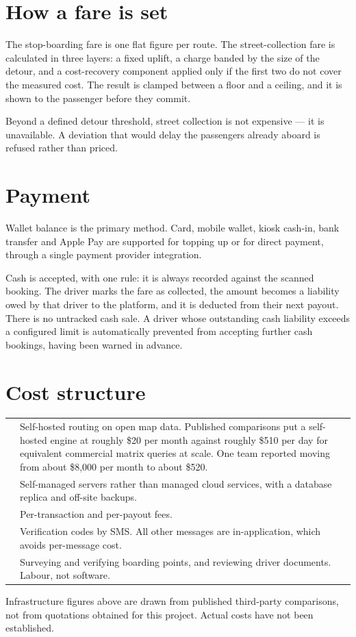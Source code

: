 \section{How a fare is set}

The stop-boarding fare is one flat figure per route. The street-collection fare is calculated in
three layers: a fixed uplift, a charge banded by the size of the detour, and a cost-recovery
component applied only if the first two do not cover the measured cost. The result is clamped
between a floor and a ceiling, and it is shown to the passenger before they commit.

Beyond a defined detour threshold, street collection is not expensive --- it is unavailable. A
deviation that would delay the passengers already aboard is refused rather than priced.

\section{Payment}

Wallet balance is the primary method. Card, mobile wallet, kiosk cash-in, bank transfer and Apple
Pay are supported for topping up or for direct payment, through a single payment provider
integration.

Cash is accepted, with one rule: it is always recorded against the scanned booking. The driver marks
the fare as collected, the amount becomes a liability owed by that driver to the platform, and it is
deducted from their next payout. There is no untracked cash sale. A driver whose outstanding cash
liability exceeds a configured limit is automatically prevented from accepting further cash
bookings, having been warned in advance.

\section{Cost structure}

\begin{center}
\begin{tabularx}{\textwidth}{@{}L{40mm}Y@{}}
\toprule
{} & Self-hosted routing on open map data. Published comparisons put a self-hosted engine at roughly \$20 per month against roughly \$510 per day for equivalent commercial matrix queries at scale. One team reported moving from about \$8{,}000 per month to about \$520. \\
 & Self-managed servers rather than managed cloud services, with a database replica and off-site backups. \\
 & Per-transaction and per-payout fees. \\
 & Verification codes by SMS. All other messages are in-application, which avoids per-message cost. \\
 & Surveying and verifying boarding points, and reviewing driver documents. Labour, not software. \\
\bottomrule
\end{tabularx}
\end{center}

\begin{notebox}
Infrastructure figures above are drawn from published third-party comparisons, not from quotations
obtained for this project. Actual costs have not been established.
\end{notebox}
